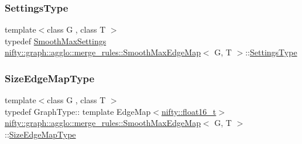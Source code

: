 \mbox{\label{classnifty_1_1graph_1_1agglo_1_1merge__rules_1_1SmoothMaxEdgeMap_a0f463ebc561d6770fa59b4168e4acf98}} 
\subsubsection{\texorpdfstring{Settings\+Type}{SettingsType}}
{\footnotesize\ttfamily template$<$class G , class T $>$ \\
typedef \hyperlink{structnifty_1_1graph_1_1agglo_1_1merge__rules_1_1SmoothMaxSettings}{Smooth\+Max\+Settings} \hyperlink{classnifty_1_1graph_1_1agglo_1_1merge__rules_1_1SmoothMaxEdgeMap}{nifty\+::graph\+::agglo\+::merge\+\_\+rules\+::\+Smooth\+Max\+Edge\+Map}$<$ G, T $>$\+::\hyperlink{classnifty_1_1graph_1_1agglo_1_1merge__rules_1_1SmoothMaxEdgeMap_a0f463ebc561d6770fa59b4168e4acf98}{Settings\+Type}}

\mbox{\label{classnifty_1_1graph_1_1agglo_1_1merge__rules_1_1SmoothMaxEdgeMap_a27bfa4de7c16550e9028903d774c705d}} 
\subsubsection{\texorpdfstring{Size\+Edge\+Map\+Type}{SizeEdgeMapType}}
{\footnotesize\ttfamily template$<$class G , class T $>$ \\
typedef Graph\+Type\+:: template Edge\+Map$<$\hyperlink{namespacenifty_a20031b62bd5c16b943905d43a8ed361a}{nifty\+::float16\+\_\+t}$>$ \hyperlink{classnifty_1_1graph_1_1agglo_1_1merge__rules_1_1SmoothMaxEdgeMap}{nifty\+::graph\+::agglo\+::merge\+\_\+rules\+::\+Smooth\+Max\+Edge\+Map}$<$ G, T $>$\+::\hyperlink{classnifty_1_1graph_1_1agglo_1_1merge__rules_1_1SmoothMaxEdgeMap_a27bfa4de7c16550e9028903d774c705d}{Size\+Edge\+Map\+Type}}



